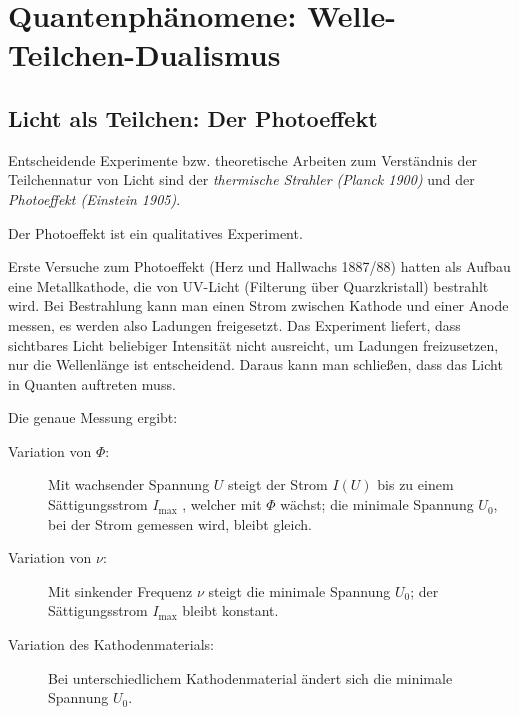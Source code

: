 \chapter[Quantenphänomene]{Quantenphänomene: Welle-Teilchen-Dualismus}

\section[Der Photoeffekt]{Licht als Teilchen: Der Photoeffekt}
Entscheidende Experimente bzw. theoretische Arbeiten zum Verständnis
der Teilchennatur von Licht sind der
\emph{thermische Strahler (Planck 1900)} 
und der \emph{Photoeffekt (Einstein 1905)}.

Der Photoeffekt ist ein qualitatives Experiment.

Erste Versuche zum Photoeffekt (Herz und Hallwachs 1887/88) hatten als
Aufbau eine Metallkathode, die von UV-Licht (Filterung über
Quarzkristall) bestrahlt wird. Bei Bestrahlung kann man einen Strom
zwischen Kathode und einer Anode messen, es werden also Ladungen
freigesetzt.
Das Experiment liefert, dass sichtbares Licht beliebiger Intensität
nicht ausreicht, um Ladungen freizusetzen, nur die Wellenlänge ist
entscheidend.
Daraus kann man schließen, dass das Licht in Quanten auftreten muss.

Die genaue Messung ergibt:
\begin{description}
\item[Variation von $\Phi$:] Mit wachsender Spannung $U$
  steigt der Strom $I(U)$ bis zu einem Sättigungsstrom $I_\text{max}$%
  , 
  welcher mit $\Phi$ wächst;
  die minimale Spannung $U_0$, bei der Strom gemessen
  wird, bleibt gleich.

\item[Variation von $\nu$:] Mit sinkender Frequenz $\nu$ steigt die
  minimale Spannung $U_0$; der Sättigungsstrom $I_\text{max}$ bleibt konstant. 

\item[Variation des Kathodenmaterials:] Bei unterschiedlichem
  Kathodenmaterial ändert sich die minimale Spannung $U_0$.
\end{description}


